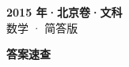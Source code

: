 \documentclass[zihao=-4, a4paper]{ctexart}
\begin{document}
\begin{center}
  {\Large\bfseries 2015 年·北京卷·文科}\\[4pt]
  {\large 数学 · 简答版}
\end{center}
\medskip
{}

\clearpage
{}
\begin{center}{\Large\bfseries 答案速查}\end{center}
\medskip

\end{document}
